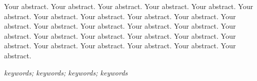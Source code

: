 Your abstract. Your abstract. Your abstract. Your abstract. Your abstract. Your abstract. Your abstract. Your abstract. Your abstract. Your abstract. Your abstract. Your abstract. Your abstract. Your abstract. Your abstract. Your abstract. Your abstract. Your abstract. Your abstract. Your abstract. Your abstract. Your abstract. Your abstract. Your abstract. Your abstract. Your abstract.

{} \textit{keywords; keywords; keywords; keywords}


































